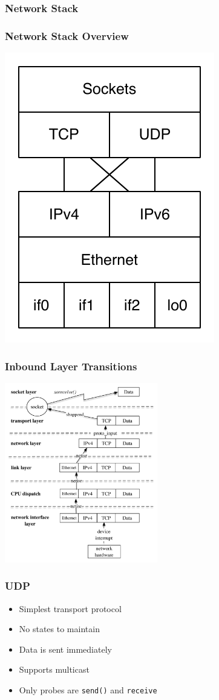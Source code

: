 \documentclass[pdftex]{beamer}
\begin{document}
\begin{frame}
  \frametitle{Network Stack}
\end{frame}

\begin{frame}
  \frametitle{Network Stack Overview}
\centering
\includegraphics{../figures/tcpipstack}
\end{frame}

\begin{frame}
\centering
  \frametitle{Inbound Layer Transitions}
\includegraphics[width=0.5\textwidth]{../figures/inbound}
\end{frame}

\begin{frame}[fragile]
  \frametitle{UDP}
  \begin{itemize}
  \item Simplest transport protocol
  \item No states to maintain
  \item Data is sent immediately
  \item Supports multicast
  \item Only probes are \verb+send()+ and \verb+receive+
  \end{itemize}
\end{frame}
\end{document}
